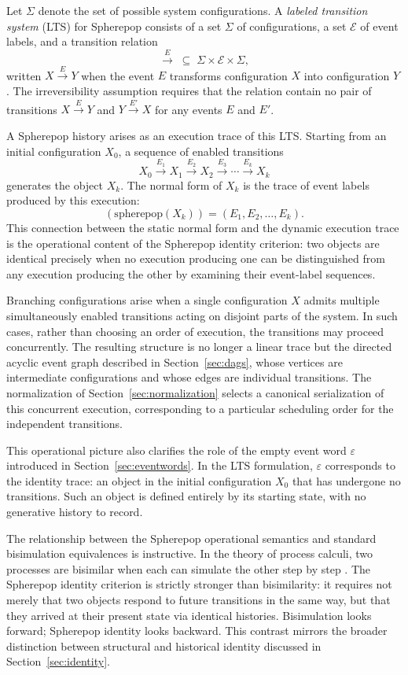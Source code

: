 \documentclass[12pt]{article}
\theoremstyle{plain}
\theoremstyle{definition}
\theoremstyle{remark}
\begin{document}
Let $\Sigma$ denote the set of possible system configurations.  A
\emph{labeled transition system} (LTS) for Spherepop consists of a set
$\Sigma$ of configurations, a set $\mathcal{E}$ of event labels, and a
transition relation
\[
  {\xrightarrow{E}} \;\subseteq\; \Sigma \times \mathcal{E} \times \Sigma,
\]
written $X \xrightarrow{E} Y$ when the event $E$ transforms configuration $X$
into configuration $Y$.  The irreversibility assumption requires that the
relation contain no pair of transitions $X \xrightarrow{E} Y$ and
$Y \xrightarrow{E'} X$ for any events $E$ and $E'$.

A Spherepop history arises as an execution trace of this LTS.  Starting from
an initial configuration $X_0$, a sequence of enabled transitions
\[
  X_0 \xrightarrow{E_1} X_1
      \xrightarrow{E_2} X_2
      \xrightarrow{E_3} \cdots
      \xrightarrow{E_k} X_k
\]
generates the object $X_k$.  The normal form of $X_k$ is the trace of event
labels produced by this execution:
\[
  (\text{spherepop}(X_k)) = (E_1, E_2, \dots, E_k).
\]
This connection between the static normal form and the dynamic execution trace
is the operational content of the Spherepop identity criterion: two objects are
identical precisely when no execution producing one can be distinguished from
any execution producing the other by examining their event-label sequences.

Branching configurations arise when a single configuration $X$ admits multiple
simultaneously enabled transitions acting on disjoint parts of the system.  In
such cases, rather than choosing an order of execution, the transitions may
proceed concurrently.  The resulting structure is no longer a linear trace but
the directed acyclic event graph described in Section~\ref{sec:dags}, whose
vertices are intermediate configurations and whose edges are individual
transitions.  The normalization of Section~\ref{sec:normalization} selects a
canonical serialization of this concurrent execution, corresponding to a
particular scheduling order for the independent transitions.

This operational picture also clarifies the role of the empty event word
$\varepsilon$ introduced in Section~\ref{sec:eventwords}.  In the LTS
formulation, $\varepsilon$ corresponds to the identity trace: an object in the
initial configuration $X_0$ that has undergone no transitions.  Such an object
is defined entirely by its starting state, with no generative history to record.

The relationship between the Spherepop operational semantics and standard
bisimulation equivalences is instructive.  In the theory of process calculi,
two processes are bisimilar when each can simulate the other step by step
\citep{Abramsky1994}.  The Spherepop identity criterion is strictly stronger
than bisimilarity: it requires not merely that two objects respond to future
transitions in the same way, but that they arrived at their present state via
identical histories.  Bisimulation looks forward; Spherepop identity looks
backward.  This contrast mirrors the broader distinction between structural and
historical identity discussed in Section~\ref{sec:identity}.
\end{document}
